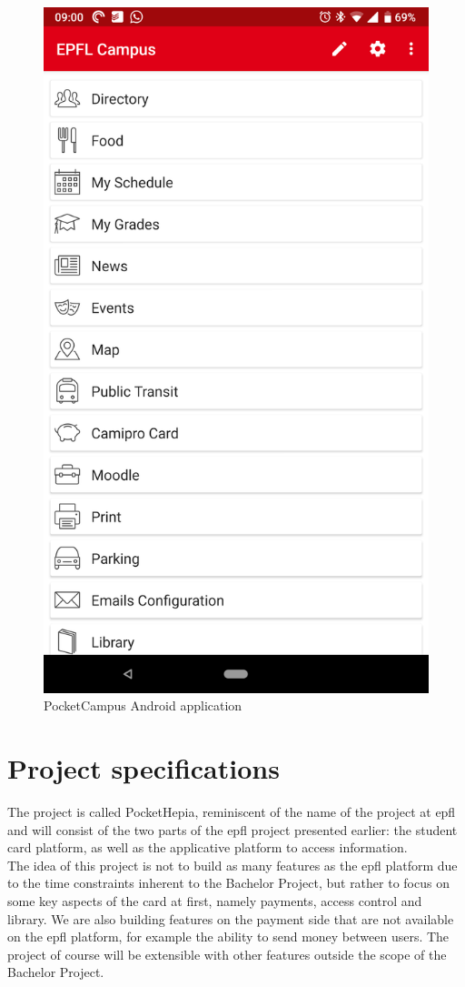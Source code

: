 \documentclass[twoside, openright,11pt,a4paper]{book}
\begin{document}
\begin{figure}[H]
\begin{center}
	\includegraphics[width=.5\textwidth]{assets/pocketcampus_mobile.png}
	\caption{PocketCampus Android application}
\end{center}
\end{figure}

\chapter{Project specifications}
The project is called PocketHepia, reminiscent of the name of the project at \gls{epfl} and will consist of the two parts of the \gls{epfl} project presented earlier: the student card platform, as well as the applicative platform to access information.\\


The idea of this project is not to build as many features as the \gls{epfl} platform due to the time constraints inherent to the Bachelor Project, but rather to focus on some key aspects of the card at first, namely payments, access control and library. We are also building features on the payment side that are not available on the \gls{epfl} platform, for example the ability to send money between users. The project of course will be extensible with other features outside the scope of the Bachelor Project. \\
\end{document}
